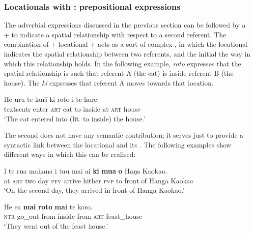 \subsubsection[Locationals with \isi{complement}: prepositional expressions]{Locationals with : prepositional expressions}\label{sec:3.6.2.2}
The adverbial expressions discussed in the previous section can be followed by a  +  to indicate a spatial relationship with respect to a second referent. The combination of  + locational +  acts as a sort of complex , in which the locational indicates the spatial relationship between two referents, and the initial  the way in which this relationship holds. In the following example, \textit{roto} expresses that the spatial relationship is such that referent A (the cat) is inside referent B (the house). The  \textit{ki} expresses that referent A moves towards that location.

\ea\label{ex:3.133}
\gll He uru te kurī ki roto i te hare.\\
textsc{ntr} enter \textsc{art} cat to inside at \textsc{art} house \\

\glt
‘The cat entered into (lit. to inside) the house.’ \textstyleExampleref{[Notes]}
\z

The second  does not have any semantic contribution; it serves just to provide a syntactic link between the locational and its . The following examples show different ways in which this  can be realised:

\ea\label{ex:3.134}
\gll {\ꞌ}I te rua mahana i tu{\ꞌ}u mai ai \textbf{ki} \textbf{mu{\ꞌ}a} \textbf{o} Haŋa Kaokao. \\
at \textsc{art} two day \textsc{pfv} arrive hither \textsc{pvp} to front of Hanga Kaokao \\

\glt 
‘On the second day, they arrived in front of Hanga Kaokao.’ \textstyleExampleref{[R539-1.570]}
\z

\ea\label{ex:3.135}
\gll He e{\ꞌ}a \textbf{mai} \textbf{roto} \textbf{mai} te koro.\\
\textsc{ntr} go\_out from inside from \textsc{art} feast\_house\\

\glt 
‘They went out of the feast house.’ \textstyleExampleref{[Mtx-6-03.090]}
\z

